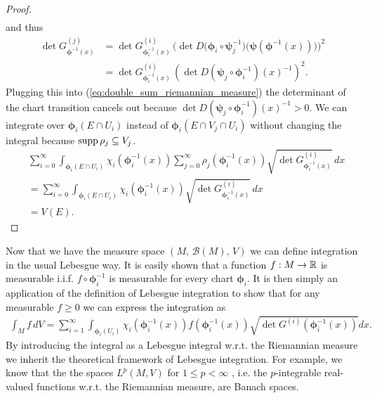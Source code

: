 \documentclass[../main.tex]{subfiles}
\begin{document}
\begin{proof}
\begin{align*}
    \end{align*}
    and thus 
    \begin{align*}
        \det G^{(j)}_{\boldsymbol{\phi}^{-1}(x)} 
        &= \det G^{(i)}_{\boldsymbol{\phi}_i^{-1}(x)} \,
            \bigg(\det D\big(\boldsymbol{\phi}_i \circ \boldsymbol{\psi}_j^{-1}\big)\big(\boldsymbol{\psi}(\boldsymbol{\phi}^{-1}(x))\big)\bigg)^2
        \\ &= \det G^{(i)}_{\boldsymbol{\phi}_i^{-1}(x)} \,
            \left( \det D(\boldsymbol{\psi}_j \circ \bm{\phi}_i^{-1})(x)^{-1}\right)^2.
    \end{align*}
    Plugging this into (\ref{eq:double_sum_riemannian_measure}) the determinant 
    of the chart transition cancels out because $\det D(\boldsymbol{\psi}_j \circ \boldsymbol{\phi}_i^{-1})(x)^{-1} > 0$.
    We can integrate over $\boldsymbol{\phi}_i(E \cap U_i)$ 
    instead of $\boldsymbol{\phi}_i(E \cap V_j \cap U_i)$ without changing the integral 
    because $\operatorname{supp} \rho_j \subseteq V_j$.
    \begin{align*}
        &\sum_{i=0}^\infty \int_{\boldsymbol{\phi}_i(E \cap U_i)} \chi_i(\boldsymbol{\phi}_i^{-1}(x))\sum_{j=0}^\infty \rho_j(\boldsymbol{\phi}_i^{-1}(x))
            \sqrt{\det G^{(i)}_{\boldsymbol{\phi}_i^{-1}(x)}} \, dx
        \\ &= \sum_{i=0}^\infty \int_{\boldsymbol{\phi}_i(E \cap U_i)} \chi_i(\boldsymbol{\phi}_i^{-1}(x))
             \sqrt{\det G^{(i)}_{\boldsymbol{\phi}_i^{-1}(x)}} \, dx
        \\ &= V(E).
    \end{align*}
\end{proof}


Now that we have the measure space $(M, \, \mathcal{B}(M), \, V)$
we can define integration in the usual Lebesgue way.
It is easily shown that a function $f: M \rightarrow \mathbb{R}$ is measurable 
i.i.f. $f \circ \boldsymbol{\phi}_i^{-1}$ is measurable for every chart $\boldsymbol{\phi}_i$. 
It is then simply an application of the definition of Lebesgue integration to
show that for any measurable $f \geq 0$ we can express the integration as
\begin{align*}
    \int_M f \, dV = \sum\limits_{i=1}^\infty \int_{\boldsymbol{\phi}_i(U_i)} 
        \chi_i(\boldsymbol{\phi}_i^{-1}(x)) f(\boldsymbol{\phi}_i^{-1}(x)) 
        \sqrt{\det G^{(i)}(\boldsymbol{\phi}_i^{-1}(x))} dx.
\end{align*}
By introducing the integral as a Lebesgue integral w.r.t. the Riemannian 
measure we inherit the theoretical framework of Lebesgue integration. 
For example, we know that the the spaces $L^p(M,V)$ for $1\leq p < \infty$
, i.e. the $p$-integrable 
real-valued functions w.r.t. the Riemannian measure, are Banach spaces.
\end{document}
